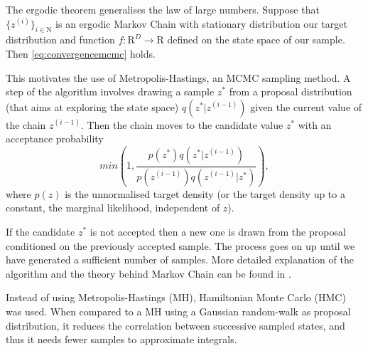    The ergodic theorem generalises the law of large numbers. Suppose that $\{z^{(i)}\}_{i \in \mathrm{N}}$ is an ergodic Markov Chain with stationary distribution our target distribution and function $f:\mathrm{R}^D \rightarrow \mathrm{R}$ defined on the state space of our sample. Then \eqref{eq:convergencemcmc} holds.
   
   This motivates the use of Metropolis-Hastings, an MCMC sampling method. A step of the algorithm involves drawing a sample $z^*$ from a proposal distribution (that aims at exploring the state space) $q(z^*|z^{(i-1)})$ given the current value of the chain $z^{(i-1)}$. Then the chain moves to the candidate value $z^*$ with an acceptance probability 
   \begin{equation}
   	min\left( 1,\frac{p(z^*)q(z^*|z^{(i-1)})}{p(z^{(i-1)})q(z^{(i-1)}|z^*)}\right),
   \end{equation} 
   where $p(z)$ is the unnormalised target density (or the target density up to a constant, the marginal likelihood, independent of $z$).
   
   If the candidate $z^*$ is not accepted then a new one is drawn from the proposal conditioned on the previously accepted sample. The process goes on up until we have generated a sufficient number of samples. More detailed explanation of the algorithm and the theory behind Markov Chain can be found in \cite{lange_markov_2010}.
   
	Instead of using Metropolis-Hastings (MH), Hamiltonian Monte Carlo (HMC) was used. When compared to a MH using a Gaussian random-walk as proposal distribution, it reduces the correlation between successive sampled states, and thus it needs fewer samples to approximate integrals.
	
	
	
   
%   
%   
%   	
%   
%   
   
